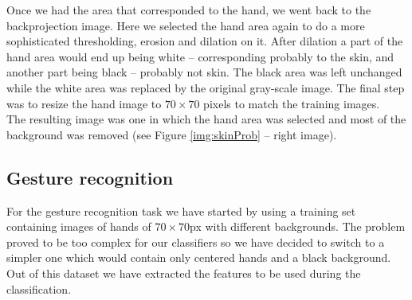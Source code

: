 \documentclass[a4paper, 11pt, twocolumn]{article}
\begin{document}
       \hspace*{10px}Once we had the area that corresponded to the hand, we went back to the backprojection image. Here we selected the hand area again to do a more sophisticated thresholding, erosion and dilation on it. After dilation a part of the hand area would end up being white -- corresponding probably to the skin, and another part being black -- probably not skin. The black area was left unchanged while the white area was replaced by the original gray-scale image. The final step was to resize the hand image to \emph{$70\times 70$} pixels to match the training images.\\
		\hspace*{10px}The resulting image was one in which the hand area was selected and most of the background was removed (see Figure \ref{img:skinProb} -- right image).
        \subsection{Gesture recognition}
		For the gesture recognition task we have started by using a training set containing images of hands of \emph{$70\times 70$}px with different backgrounds. The problem proved to be too complex for our classifiers so we have decided to switch to a simpler one which would contain only centered hands and a black background.\\ 
		\hspace*{10px}Out of this dataset we have extracted the features to be used during the classification.
		\label{sec:Meth_clssifyHands}
\end{document}
